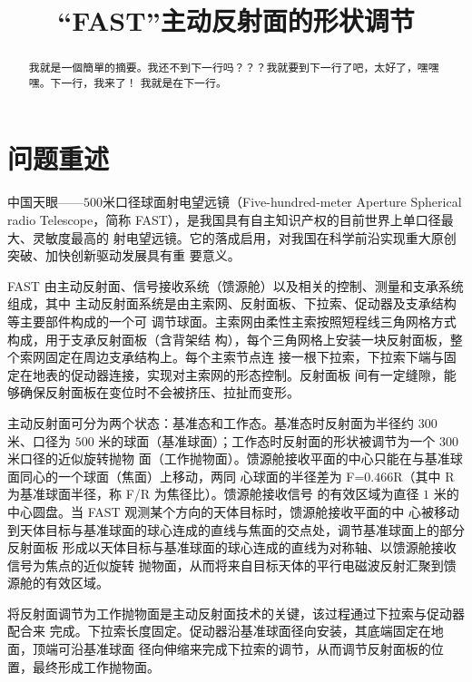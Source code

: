 \documentclass[withoutpreface,bwprint]{cumcmthesis} %
\title{“FAST”主动反射面的形状调节}
\begin{document}
\maketitle
\begin{abstract}
    我就是一個簡單的摘要。我还不到下一行吗？？？我就要到下一行了吧，太好了，嘿嘿嘿。下一行，我来了！
    我就是在下一行。
\end{abstract}



\section{问题重述}
中国天眼——$500$米口径球面射电望远镜（Five-hundred-meter Aperture Spherical radio
Telescope，简称 FAST），是我国具有自主知识产权的目前世界上单口径最大、灵敏度最高的
射电望远镜。它的落成启用，对我国在科学前沿实现重大原创突破、加快创新驱动发展具有重
要意义。

FAST 由主动反射面、信号接收系统（馈源舱）以及相关的控制、测量和支承系统组成，其中
主动反射面系统是由主索网、反射面板、下拉索、促动器及支承结构等主要部件构成的一个可
调节球面。主索网由柔性主索按照短程线三角网格方式构成，用于支承反射面板（含背架结
构），每个三角网格上安装一块反射面板，整个索网固定在周边支承结构上。每个主索节点连
接一根下拉索，下拉索下端与固定在地表的促动器连接，实现对主索网的形态控制。反射面板
间有一定缝隙，能够确保反射面板在变位时不会被挤压、拉扯而变形。

主动反射面可分为两个状态：基准态和工作态。基准态时反射面为半径约 $300$ 米、口径为
$500$ 米的球面（基准球面）；工作态时反射面的形状被调节为一个 $300$ 米口径的近似旋转抛物
面（工作抛物面）。馈源舱接收平面的中心只能在与基准球面同心的一个球面（焦面）上移动，两同
心球面的半径差为 F=$0.466$R（其中 R 为基准球面半径，称 F/R 为焦径比）。馈源舱接收信号
的有效区域为直径 $1$ 米的中心圆盘。当 FAST 观测某个方向的天体目标时，馈源舱接收平面的中
心被移动到天体目标与基准球面的球心连成的直线与焦面的交点处，调节基准球面上的部分反射面板
形成以天体目标与基准球面的球心连成的直线为对称轴、以馈源舱接收信号为焦点的近似旋转
抛物面，从而将来自目标天体的平行电磁波反射汇聚到馈源舱的有效区域。

将反射面调节为工作抛物面是主动反射面技术的关键，该过程通过下拉索与促动器配合来
完成。下拉索长度固定。促动器沿基准球面径向安装，其底端固定在地面，顶端可沿基准球面
径向伸缩来完成下拉索的调节，从而调节反射面板的位置，最终形成工作抛物面。
\end{document}
